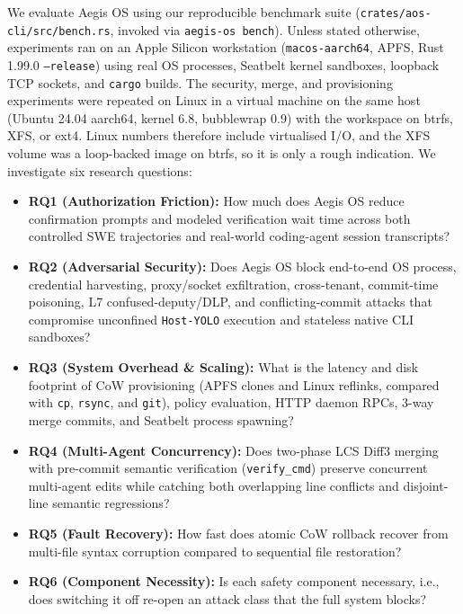 \documentclass[10pt,twocolumn]{article}
\begin{document}
We evaluate Aegis OS using our reproducible benchmark suite (\texttt{crates/aos-cli/src/bench.rs}, invoked via \texttt{aegis-os bench}). Unless stated otherwise, experiments ran on an Apple Silicon workstation (\texttt{macos-aarch64}, APFS, Rust 1.99.0 \texttt{--release}) using real OS processes, Seatbelt kernel sandboxes, loopback TCP sockets, and \texttt{cargo} builds. The security, merge, and provisioning experiments were repeated on Linux in a virtual machine on the same host (Ubuntu 24.04 aarch64, kernel 6.8, bubblewrap 0.9) with the workspace on btrfs, XFS, or ext4. Linux numbers therefore include virtualised I/O, and the XFS volume was a loop-backed image on btrfs, so it is only a rough indication. We investigate six research questions:
\begin{itemize}
    \item \textbf{RQ1 (Authorization Friction):} How much does Aegis OS reduce confirmation prompts and modeled verification wait time across both controlled SWE trajectories and real-world coding-agent session transcripts?
    \item \textbf{RQ2 (Adversarial Security):} Does Aegis OS block end-to-end OS process, credential harvesting, proxy/socket exfiltration, cross-tenant, commit-time poisoning, L7 confused-deputy/DLP, and conflicting-commit attacks that compromise unconfined \texttt{Host-YOLO} execution and stateless native CLI sandboxes?
    \item \textbf{RQ3 (System Overhead \& Scaling):} What is the latency and disk footprint of CoW provisioning (APFS clones and Linux reflinks, compared with \texttt{cp}, \texttt{rsync}, and \texttt{git}), policy evaluation, HTTP daemon RPCs, 3-way merge commits, and Seatbelt process spawning?
    \item \textbf{RQ4 (Multi-Agent Concurrency):} Does two-phase LCS Diff3 merging with pre-commit semantic verification (\texttt{verify\_cmd}) preserve concurrent multi-agent edits while catching both overlapping line conflicts and disjoint-line semantic regressions?
    \item \textbf{RQ5 (Fault Recovery):} How fast does atomic CoW rollback recover from multi-file syntax corruption compared to sequential file restoration?
    \item \textbf{RQ6 (Component Necessity):} Is each safety component necessary, i.e., does switching it off re-open an attack class that the full system blocks?
\end{itemize}
\end{document}
